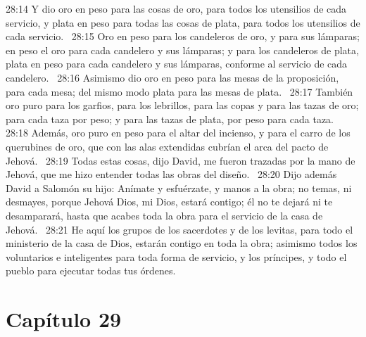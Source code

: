 28:14 Y dio oro en peso para las cosas de oro, para todos los utensilios de cada servicio, y plata en peso para todas las cosas de plata, para todos los utensilios de cada servicio.  
28:15 Oro en peso para los candeleros de oro, y para sus lámparas; en peso el oro para cada candelero y sus lámparas; y para los candeleros de plata, plata en peso para cada candelero y sus lámparas, conforme al servicio de cada candelero.  
28:16 Asimismo dio oro en peso para las mesas de la proposición, para cada mesa; del mismo modo plata para las mesas de plata.  
28:17 También oro puro para los garfios, para los lebrillos, para las copas y para las tazas de oro; para cada taza por peso; y para las tazas de plata, por peso para cada taza.  
28:18 Además, oro puro en peso para el altar del incienso, y para el carro de los querubines de oro, que con las alas extendidas cubrían el arca del pacto de Jehová.  
28:19 Todas estas cosas, dijo David, me fueron trazadas por la mano de Jehová, que me hizo entender todas las obras del diseño.  
28:20 Dijo además David a Salomón su hijo: Anímate y esfuérzate, y manos a la obra; no temas, ni desmayes, porque Jehová Dios, mi Dios, estará contigo; él no te dejará ni te desamparará, hasta que acabes toda la obra para el servicio de la casa de Jehová.  
28:21 He aquí los grupos de los sacerdotes y de los levitas, para todo el ministerio de la casa de Dios, estarán contigo en toda la obra; asimismo todos los voluntarios e inteligentes para toda forma de servicio, y los príncipes, y todo el pueblo para ejecutar todas tus órdenes.  
\section*{Capítulo 29 }

